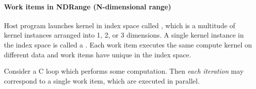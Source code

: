 \documentclass{memo}
\begin{document}
\paragraph{Work items in NDRange (N-dimensional range)}
Host program launches kernel in index space called , which is a
multitude of kernel instances arranged into 1, 2, or 3 dimensions.
A single kernel instance in the index space is called a .
Each work item executes the same compute kernel on different data and work
items have unique  in the index space.

Consider a C loop which performs some computation. Then {\em each iteration\/}
may correspond to a single work item, which are executed in parallel.
\end{document}
